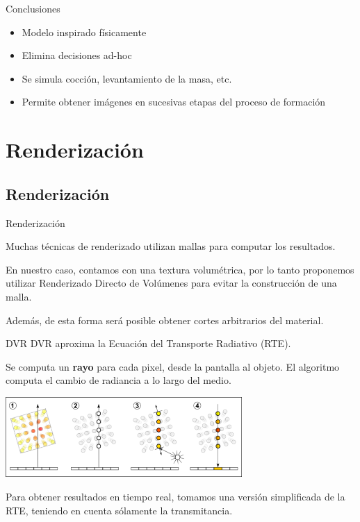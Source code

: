\documentclass[spanish]{beamer}
\begin{document}
\begin{frame}{Conclusiones}
\begin{block}{}
\begin{itemize}
\item Modelo inspirado físicamente
\item Elimina decisiones ad-hoc
\item Se simula cocción, levantamiento de la masa, etc.
\item Permite obtener imágenes en sucesivas etapas del proceso de formación
\end{itemize}
\end{block}
\end{frame}

\section{Renderización}
\subsection{Renderización}

\begin{frame}{Renderización}

Muchas técnicas de renderizado utilizan mallas para computar los resultados.

En nuestro caso, contamos con una textura volumétrica, por lo tanto proponemos utilizar Renderizado Directo de Volúmenes para evitar la construcción de una malla.

Además, de esta forma será posible obtener cortes arbitrarios del material.

\end{frame}

\begin{frame}{DVR}
DVR aproxima la Ecuación del Transporte Radiativo (RTE).

Se computa un \textbf{rayo} para cada pixel, desde la pantalla al objeto. El algoritmo computa el cambio de radiancia a lo largo del medio.


\centerline{\includegraphics[width=9cm]{../figures/dvr}}

Para obtener resultados en tiempo real, tomamos una versión simplificada de la RTE, teniendo en cuenta sólamente la transmitancia.
\end{frame}
\end{document}
